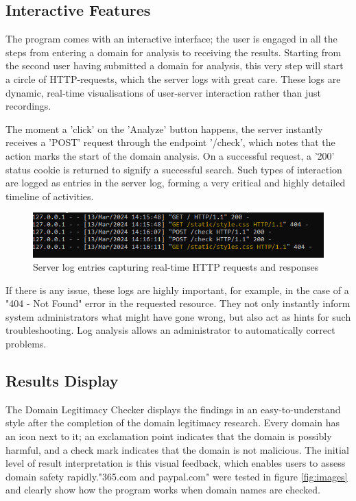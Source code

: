 \subsection{Interactive Features}

The program comes with an interactive interface; the user is engaged in all the steps from entering a domain for analysis to receiving the results. Starting from the second user having submitted a domain for analysis, this very step will start a circle of HTTP-requests, which the server logs with great care. These logs are dynamic, real-time visualisations of user-server interaction rather than just recordings.


The moment a 'click' on the 'Analyze' button happens, the server instantly receives a 'POST' request through the endpoint '/check', which notes that the action marks the start of the domain analysis. On a successful request, a '200' status cookie is returned to signify a successful search. Such types of interaction are logged as entries in the server log, forming a very critical and highly detailed timeline of activities.

\begin{figure}[H]
    \centering
    \includegraphics[width=0.8\linewidth]{project/I.png}
    \caption{Server log entries capturing real-time HTTP requests and responses}
    \label{fig:imple22222}
\end{figure}

If there is any issue, these logs are highly important, for example, in the case of a "404 - Not Found" error in the requested resource. They not only instantly inform system administrators what might have gone wrong, but also act as hints for such troubleshooting. Log analysis allows an administrator to automatically correct problems.

\subsection{Results Display}

The Domain Legitimacy Checker displays the findings in an easy-to-understand style after the completion of the domain legitimacy research. Every domain has an icon next to it; an exclamation point indicates that the domain is possibly harmful, and a check mark indicates that the domain is not malicious. The initial level of result interpretation is this visual feedback, which enables users to assess domain safety rapidly."365.com and paypal.com" were tested in figure \ref{fig:images} and clearly show how the program works when domain names are checked. 

